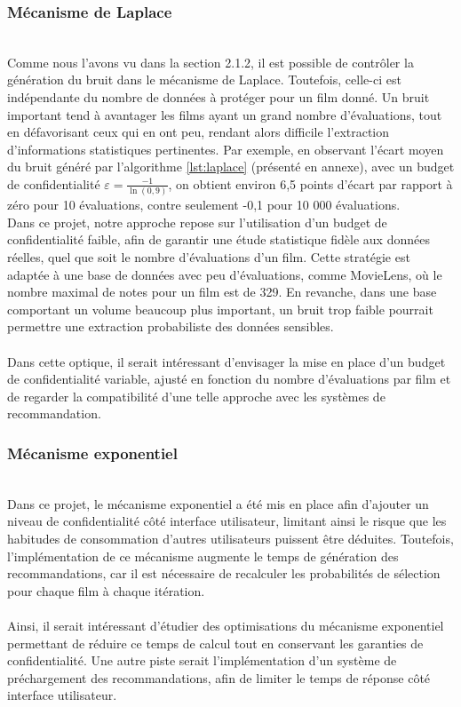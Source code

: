 \documentclass{article}
\begin{document}
\subsubsection{Mécanisme de Laplace}
$ $\\
Comme nous l’avons vu dans la section 2.1.2, il est possible de contrôler la génération du bruit dans le mécanisme de Laplace.
Toutefois, celle-ci est indépendante du nombre de données à protéger pour un film donné. Un bruit important tend à avantager les
films ayant un grand nombre d’évaluations, tout en défavorisant ceux qui en ont peu, rendant alors difficile l’extraction d’informations
statistiques pertinentes. Par exemple, en observant l’écart moyen du bruit généré par l’algorithme \ref{lst:laplace} (présenté en annexe),
avec un budget de confidentialité $\varepsilon = \frac{-1}{\ln(0{,}9)}$, on obtient environ 6,5 points d’écart par rapport à zéro pour 10
évaluations, contre seulement -0,1 pour 10 000 évaluations.\\
Dans ce projet, notre approche repose sur l’utilisation d’un budget de confidentialité faible, afin de garantir une étude statistique
fidèle aux données réelles, quel que soit le nombre d’évaluations d’un film. Cette stratégie est adaptée à une base de données avec
peu d’évaluations, comme MovieLens, où le nombre maximal de notes pour un film est de 329. En revanche, dans une base comportant un volume
beaucoup plus important, un bruit trop faible pourrait permettre une extraction probabiliste des données sensibles.\\
\\
Dans cette optique, il serait intéressant d’envisager la mise en place d’un budget de confidentialité variable, ajusté en fonction du nombre d’évaluations
par film et de regarder la compatibilité d'une telle approche avec les systèmes de recommandation.
\subsubsection{Mécanisme exponentiel}
$ $\\
Dans ce projet, le mécanisme exponentiel a été mis en place afin d’ajouter un niveau de confidentialité côté interface utilisateur, limitant
ainsi le risque que les habitudes de consommation d'autres utilisateurs puissent être déduites. Toutefois, l’implémentation de ce mécanisme
augmente le temps de génération des recommandations, car il est nécessaire de recalculer les probabilités de sélection pour chaque film à chaque itération.\\
\\
Ainsi, il serait intéressant d’étudier des optimisations du mécanisme exponentiel permettant de réduire ce temps de calcul tout en conservant les garanties
de confidentialité. Une autre piste serait l’implémentation d’un système de préchargement des recommandations, afin de limiter le temps de réponse côté interface utilisateur.
\end{document}
